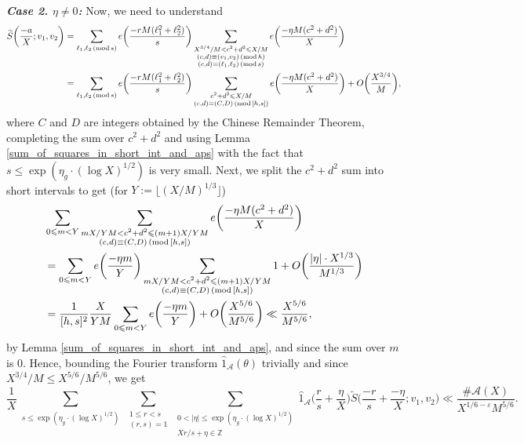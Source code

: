 \documentclass[12pt]{amsart}
\theoremstyle{definition}
\theoremstyle{definition}
\theoremstyle{remark}
\numberwithin{equation}{section}
\newcommand{\Z}{\mathbb{Z}}
\newcommand{\CA}{\mathcal{A}}
\renewcommand{\leq}{\leqslant}
\renewcommand{\hat}{\widehat}
\renewcommand{\tilde}{\widetilde}
\renewcommand{\mod}[1]{\,({\rm mod}\,#1)}
\begin{document}
\noindent \textit{\textbf{Case 2. $\eta\not=0$:}} Now, we need to understand
\begin{align*}
\tilde{S}\bigg( \frac{-a}{X} ; v_1,v_2 \bigg) &= \sum_{\ell_1,\ell_2 \mod s} e\bigg( \frac{-rM(\ell_1^2+\ell_2^2)}{s} \bigg) \sum_{\substack{ X^{3/4}/M < c^2+d^2 \leq X/M \\ (c,d)\equiv (v_1,v_2)\mod h \\ (c,d)\equiv (\ell_1,\ell_2) \mod s}} e\bigg( \frac{-\eta M (c^2+d^2)}{X} \bigg) \\
&= \sum_{\ell_1,\ell_2 \mod s} e\bigg( \frac{-rM(\ell_1^2+\ell_2^2)}{s} \bigg) \sum_{\substack{c^2+d^2 \leq X/M \\ (c,d)\equiv (C,D)\mod{[h,s]}}} e\bigg( \frac{-\eta M (c^2+d^2)}{X} \bigg) + O\bigg( \frac{X^{3/4}}{M}  \bigg) ,
\end{align*}
where $C$ and $D$ are integers obtained by the Chinese Remainder Theorem, completing the sum over $c^2+d^2$ and using Lemma \ref{sum_of_squares_in_short_int_and_aps} with the fact that $s \leq \exp(\eta_g \cdot (\log X)^{1/2})$ is very small. Next, we split the $c^2+d^2$ sum into short intervals to get (for $Y:=\lfloor (X/M)^{1/3}\rfloor$)
\begin{align*}
&\sum_{0\leq m< Y} \sum_{\substack{mX/YM< c^2+d^2 \leq (m+1) X/YM \\ (c,d)\equiv (C,D)\mod{[h,s]}}} e\bigg( \frac{-\eta M(c^2+d^2)}{X} \bigg)  \\
&= \sum_{0\leq m< Y}e\bigg( \frac{-\eta m}{Y} \bigg) \sum_{\substack{mX/YM< c^2+d^2 \leq (m+1)X/YM \\ (c,d)\equiv (C,D)\mod{[h,s]}}} 1 + O\bigg( \frac{|\eta|\cdot  X^{1/3}}{M^{1/3}} \bigg) \\
&= \frac{1}{[h,s]^2} \frac{X}{YM} \sum_{0\leq m< Y}e\bigg( \frac{-\eta m}{Y} \bigg) + O\bigg( \frac{X^{5/6}}{M^{5/6}} \bigg) \ll  \frac{X^{5/6}}{M^{5/6}},
\end{align*}
by Lemma \ref{sum_of_squares_in_short_int_and_aps}, and since the sum over $m$ is 0. Hence, bounding the Fourier transform $\hat{1}_{\CA}(\theta)$ trivially and since $X^{3/4}/M \leq X^{5/6}/M^{5/6}$, we get
$$ \frac{1}{X} \sum_{\substack{s\leq \exp(\eta_g\cdot (\log X)^{1/2}) }} \sum_{\substack{1\leq r < s \\ (r,s)=1}} \sum_{\substack{0<|\eta|\leq \exp(\eta_g\cdot (\log X)^{1/2}) \\ Xr/s + \eta\in \Z}}\hat{1}_{\CA}\bigg(\frac{r}{s}+ \frac{\eta}{X}\bigg) \tilde{S}\bigg(\frac{-r}{s} + \frac{-\eta}{X}; v_1,v_2\bigg) \ll \frac{\#\CA(X)}{X^{1/6-\varepsilon}M^{5/6}} .$$
\end{document}
